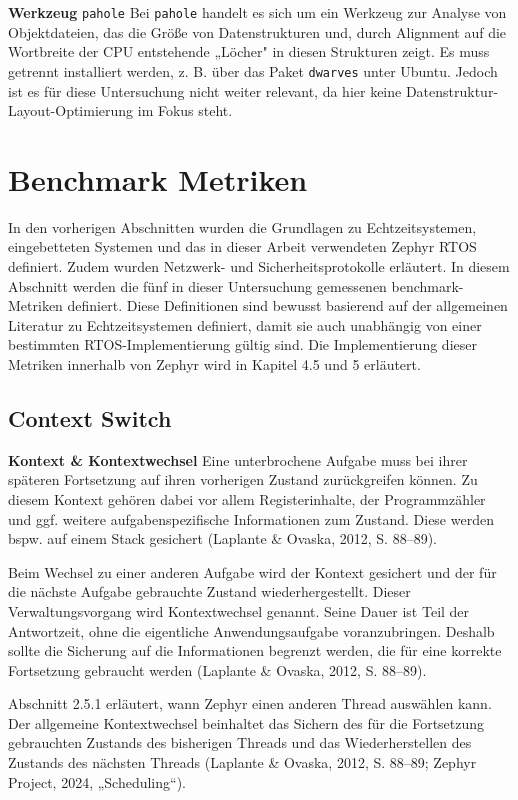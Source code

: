 \textbf{Werkzeug }\lstinline[style=fileinline]|pahole|\textbf{ }Bei \lstinline[style=fileinline]|pahole| handelt es sich um ein Werkzeug zur Analyse von Objektdateien, das die Größe von Datenstrukturen und, durch Alignment auf die Wortbreite der CPU entstehende „Löcher" in diesen Strukturen zeigt. Es muss getrennt installiert werden, z. B. über das Paket \lstinline[style=fileinline]|dwarves| unter Ubuntu. Jedoch ist es für diese Untersuchung nicht weiter relevant, da hier keine Datenstruktur-Layout-Optimierung im Fokus steht.

\section{Benchmark Metriken}
In den vorherigen Abschnitten wurden die Grundlagen zu Echtzeitsystemen, eingebetteten Systemen und das in dieser Arbeit verwendeten Zephyr RTOS definiert. Zudem wurden Netzwerk- und Sicherheitsprotokolle erläutert. In diesem Abschnitt werden die fünf in dieser Untersuchung gemessenen benchmark-Metriken definiert. Diese Definitionen sind bewusst basierend auf der allgemeinen Literatur zu Echtzeitsystemen definiert, damit sie auch unabhängig von einer bestimmten RTOS-Implementierung gültig sind. Die Implementierung dieser Metriken innerhalb von Zephyr wird in Kapitel 4.5 und 5 erläutert.

\subsection{Context Switch}
\textbf{Kontext \& Kontextwechsel }Eine unterbrochene Aufgabe muss bei ihrer späteren Fortsetzung auf ihren vorherigen Zustand zurückgreifen können. Zu diesem Kontext gehören dabei vor allem Registerinhalte, der Programmzähler und ggf. weitere aufgabenspezifische Informationen zum Zustand. Diese werden bspw. auf einem Stack gesichert (Laplante \& Ovaska, 2012, S. 88–89).

Beim Wechsel zu einer anderen Aufgabe wird der Kontext gesichert und der für die nächste Aufgabe gebrauchte Zustand wiederhergestellt. Dieser Verwaltungsvorgang wird Kontextwechsel genannt. Seine Dauer ist Teil der Antwortzeit, ohne die eigentliche Anwendungsaufgabe voranzubringen. Deshalb sollte die Sicherung auf die Informationen begrenzt werden, die für eine korrekte Fortsetzung gebraucht werden (Laplante \& Ovaska, 2012, S. 88–89).

Abschnitt 2.5.1 erläutert, wann Zephyr einen anderen Thread auswählen kann. Der allgemeine Kontextwechsel beinhaltet das Sichern des für die Fortsetzung gebrauchten Zustands des bisherigen Threads und das Wiederherstellen des Zustands des nächsten Threads (Laplante \& Ovaska, 2012, S. 88–89; Zephyr Project, 2024, „Scheduling“).

